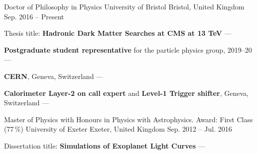
\newcommand{\vpaddingEdu}{\vspace{0.5mm}}

\begin{cventries}
    \cventry
        {Doctor of Philosophy in Physics} %
        {University of Bristol} %
        {Bristol, United Kingdom} %
        {Sep. 2016 -- Present} %
        {
        \begin{cvitems} %
            \item {Thesis title: \textbf{Hadronic Dark Matter Searches at CMS at 13 TeV} --- }
            \vpaddingEdu
            \item {\textbf{Postgraduate student representative} for the particle physics group, 2019--20 --- } %
            \vpaddingEdu
            \item {\textbf{CERN}, Geneva, Switzerland --- }
            \item {\textbf{Calorimeter Layer-2 on call expert} and \textbf{Level-1 Trigger shifter}, Geneva, Switzerland --- }
        \end{cvitems}
        }

    \cventry
        {Master of Physics with Honours in Physics with Astrophysics. Award: First Class (77\,\%)}
        {University of Exeter}
        {Exeter, United Kingdom}
        {Sep. 2012 -- Jul. 2016}
        {
        \begin{cvitems} %
            \item {Dissertation title: \textbf{Simulations of Exoplanet Light Curves} --- }
        \end{cvitems}
        } %


\end{cventries}
